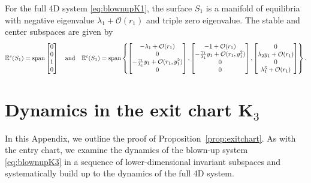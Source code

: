 \documentclass[10pt,onecolumn]{article}
\theoremstyle{plain}
\begin{document}
For the full 4D system \eqref{eq:blownupK1}, the surface $S_1$ is a manifold of equilibria with negative eigenvalue $\lambda_1 + \mathcal O(r_1)$ and triple zero eigenvalue. The stable and center subspaces are given by  
%
\[ \mathbb E^s(S_1) = {\rm span}\begin{bmatrix} 0\\0\\1\\0 \end{bmatrix} \quad {\rm and } \quad \mathbb E^c (S_1) = {\rm span} \left\{ \begin{bmatrix} -\lambda_1+\mathcal O(r_1) \\ 0 \\ -\tfrac{\gamma_1}{\lambda_1} y_1 + \mathcal O(r_1, y_1^2) \\ 0 \end{bmatrix}, \begin{bmatrix} -1+\mathcal O(r_1) \\ -\tfrac{\gamma_1}{\lambda_1} y_1 + \mathcal O(r_1, y_1^2) \\ 0 \\ 0 \end{bmatrix}, \begin{bmatrix} 0 \\ \lambda_2 y_1 + \mathcal O(r_1) \\ 0 \\ \lambda_1^3 + \mathcal O(r_1) \end{bmatrix}\right\}. \]
%

\section{Dynamics in the exit chart $\boldsymbol K_3$}  \label{appendix:exitchart}
In this Appendix, we outline the proof of Proposition~\ref{prop:exitchart}.  As with the entry chart, we examine the dynamics of the blown-up system \eqref{eq:blownupK3} in a sequence of lower-dimensional invariant subspaces and systematically build up to the dynamics of the full 4D system. 
\end{document}
